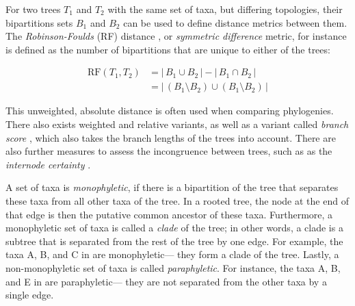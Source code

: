 For two trees $T_1$ and $T_2$ with the same set of taxa, but differing topologies,
their bipartitions sets $B_1$ and $B_2$ can be used to define distance metrics between them.
The \emph{Robinson-Foulds} (RF) distance \cite{Robinson1981}, or \emph{symmetric difference} metric,
for instance is defined as the number of bipartitions that are unique to either of the trees:

\begin{align}
    \label{ch:Foundations:sec:TreeOfLife:eq:RF-Distance}
    \mbox{RF}(T_1, T_2)
    &= |\, B_1 \cup B_2 \,| - |\, B_1 \cap B_2 \,| \nonumber \\[0.7em]
    &= |\, ( B_1 \setminus B_2 ) \cup ( B_1 \setminus B_2 ) \,|
\end{align}

This unweighted, absolute distance is often used when comparing phylogenies.
There also exists weighted and relative variants, as well as a variant called \emph{branch score} \cite{Kuhner1994},
which also takes the branch lengths of the trees into account.
There are also further measures to assess the incongruence between trees,
such as as the \emph{internode certainty} \cite{Salichos2013,Zhou2017}.

A set of taxa is \emph{monophyletic},
if there is a bipartition of the tree that separates these taxa from all other taxa of the tree.
In a rooted tree, the node at the end of that edge is then the putative common ancestor of these taxa.
Furthermore, a monophyletic set of taxa is called a \emph{clade} of the tree;
in other words, a clade is a subtree that is separated from the rest of the tree by one edge.
For example, the taxa {\sffamily A}, {\sffamily B}, and {\sffamily C} in  are monophyletic---%
they form a clade of the tree.
Lastly, a non-monophyletic set of taxa is called \emph{paraphyletic}.
For instance, the taxa {\sffamily A}, {\sffamily B}, and {\sffamily E} in  are paraphyletic---%
they are not separated from the other taxa by a single edge.

